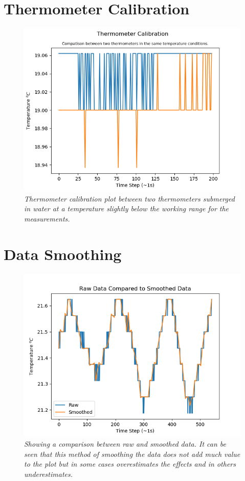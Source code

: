 \documentclass[10pt]{article}
\begin{document}
\section{Thermometer Calibration}\label{app:therm_calib}
\begin{figure}[h!]
    \centering
    \includegraphics[scale=0.75]{therm_calib_low.png}
    \caption{\it{Thermometer calibration plot between two thermometers submerged in water at a temperature slightly below the working range for the measurements.}}
    \label{fig:therm_calib}
\end{figure}
\newpage
\section{Data Smoothing}\label{app:smoothed}

\begin{figure}[h!]
    \centering
    \includegraphics[scale=0.75]{raw_vs_smoothed.png}
    \caption{\it{Showing a comparison between raw and smoothed data. It can be seen that this method of smoothing the data does not add much value to the plot but in some cases overestimates the effects and in others underestimates.}}
    \label{fig:raw_vs_smooth}
\end{figure}
\end{document}
